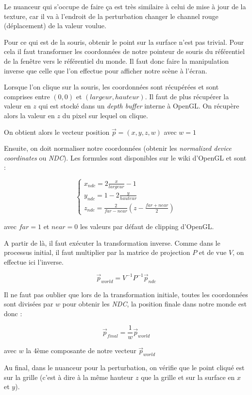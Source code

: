 \documentclass[a4paper,11pt,leqno]{article}
\begin{document}
Le nuanceur qui s'occupe de faire ça est très similaire à celui de mise à jour de la texture, car il va à l'endroit de la perturbation changer le channel rouge (déplacement) de la valeur voulue.

Pour ce qui est de la souris, obtenir le point sur la surface n'est pas trivial. Pour cela il faut transformer les coordonnées de notre pointeur de souris du référentiel de la fenêtre vers le référentiel du monde. Il faut donc faire la manipulation inverse que celle que l'on effectue pour afficher notre scène à l'écran.

Lorsque l'on clique sur la souris, les coordonnées sont récupérées et sont comprises entre $(0, 0)$ et $(largeur, hauteur)$. Il faut de plus récupérer la valeur en $z$ qui est stocké dans un \emph{depth buffer} interne à OpenGL. On récupère alors la valeur en $z$ du pixel sur lequel on clique.

On obtient alors le vecteur position $\overrightarrow{p} = (x,y,z,w)$ avec $w=1$

Ensuite, on doit normaliser notre coordonnées (obtenir les \emph{normalized device coordinates} ou \emph{NDC}). Les formules sont disponibles sur le wiki d'OpenGL et sont :

\[
\begin{cases}
	x_{ndc} = 2\frac{x}{largeur} - 1\\
	y_{ndc} = 1 - 2 \frac{y}{hauteur}\\
	z_{ndc} = \frac{2}{far - near}( z - \frac{far + near}{2})
\end{cases}
\]

avec $far = 1$ et $near = 0$ les valeurs par défaut de clipping d'OpenGL.

A partir de là, il faut exécuter la transformation inverse. Comme dans le processus initial, il faut multiplier par la matrice de projection $P$ et de vue $V$, on effectue ici l'inverse.

\[
	\overrightarrow{p}_{world} = V^{-1}P^{-1} \overrightarrow{p}_{ndc}
\]

Il ne faut pas oublier que lors de la transformation initiale, toutes les coordonnées sont divisées par $w$ pour obtenir les \emph{NDC}, la position finale dans notre monde est donc :

\[
	\overrightarrow{p}_{final} = \frac{1}{w} \overrightarrow{p}_{world}
\]

avec $w$ la 4ème composante de notre vecteur $\overrightarrow{p}_{world}$

Au final, dans le nuanceur pour la perturbation, on vérifie que le point cliqué est sur la grille (c'est à dire à la même hauteur $z$ que la grille et sur la surface en $x$ et $y$).
\end{document}
